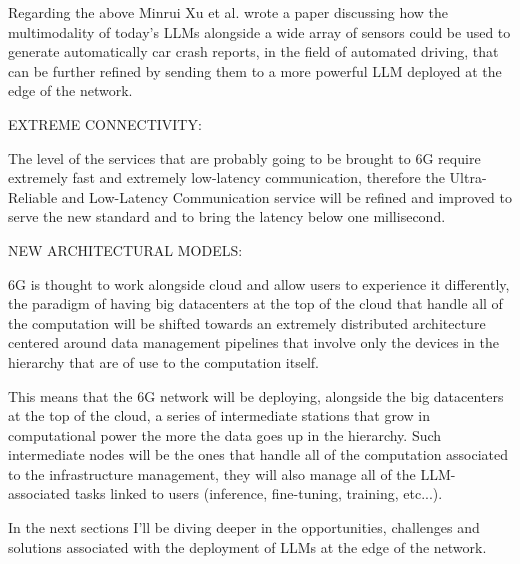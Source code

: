 Regarding the above Minrui Xu et al. \cite{pga} wrote a paper discussing how the multimodality of
today’s LLMs alongside a wide array of sensors could be used to generate automatically car crash
reports, in the field of automated driving, that can be further refined by sending them to a more
powerful LLM deployed at the edge of the network.

\bigskip
\noindent
EXTREME CONNECTIVITY:
\label{ssec:extreme-connectivity}

The level of the services that are probably going to be brought to 6G require extremely fast and
extremely low-latency communication, therefore the Ultra-Reliable and Low-Latency Communication
service will be refined and improved to serve the new standard and to bring the latency below one
millisecond.

\bigskip
\noindent
NEW ARCHITECTURAL MODELS:
\label{ssec:architectural-models}

6G is thought to work alongside cloud and allow users to experience it differently, the paradigm of
having big datacenters at the top of the cloud that handle all of the computation will be shifted
towards an extremely distributed architecture centered around data management pipelines that involve
only the devices in the hierarchy that are of use to the computation itself.

This means that the 6G network will be deploying, alongside the big datacenters at the top of the
cloud, a series of intermediate stations that grow in computational power the more the data goes up
in the hierarchy. Such intermediate nodes will be the ones that handle all of the computation
associated to the infrastructure management, they will also manage all of the LLM-associated tasks
linked to users (inference, fine-tuning, training, etc...).

\medskip
In the next sections I’ll be diving deeper in the opportunities, challenges and solutions associated
with the deployment of LLMs at the edge of the network.
